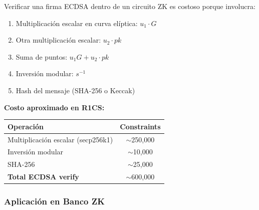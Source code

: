 \documentclass[11pt,a4paper,twoside,openright]{book}
\theoremstyle{definition}
\theoremstyle{plain}
\theoremstyle{remark}
\begin{document}
\begin{mathnote}
Verificar una firma ECDSA dentro de un circuito ZK es costoso porque involucra:
\begin{enumerate}
    \item Multiplicación escalar en curva elíptica: $u_1 \cdot G$
    \item Otra multiplicación escalar: $u_2 \cdot pk$
    \item Suma de puntos: $u_1 G + u_2 \cdot pk$
    \item Inversión modular: $s^{-1}$
    \item Hash del mensaje (SHA-256 o Keccak)
\end{enumerate}

\textbf{Costo aproximado en R1CS:}
\begin{center}
\begin{tabular}{lc}
\toprule
\textbf{Operación} & \textbf{Constraints} \\
\midrule
Multiplicación escalar (secp256k1) & $\sim$250,000 \\
Inversión modular & $\sim$10,000 \\
SHA-256 & $\sim$25,000 \\
\midrule
\textbf{Total ECDSA verify} & $\sim$600,000 \\
\bottomrule
\end{tabular}
\end{center}
\end{mathnote}

\subsubsection{Aplicación en Banco ZK}
\end{document}
